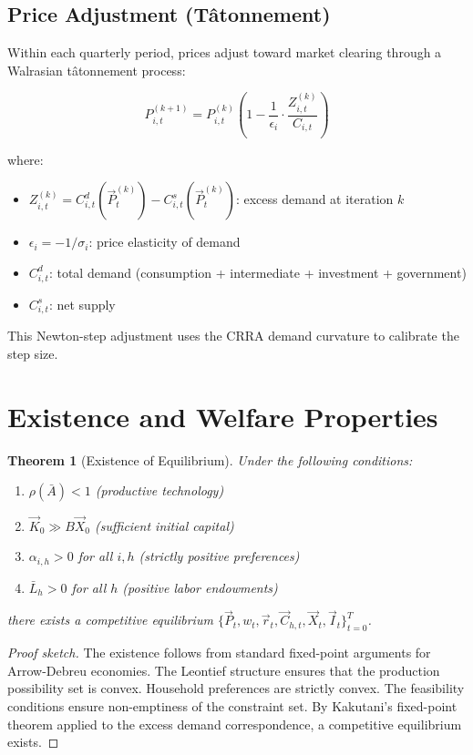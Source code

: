 \documentclass[12pt,a4paper]{article}
\newtheorem{theorem}{Theorem}[section]
\theoremstyle{definition}
\theoremstyle{remark}
\begin{document}
\subsection{Price Adjustment (Tâtonnement)}

Within each quarterly period, prices adjust toward market clearing through a Walrasian tâtonnement process:

\begin{equation}
    P_{i,t}^{(k+1)} = P_{i,t}^{(k)} \left(1 - \frac{1}{\epsilon_i} \cdot \frac{Z_{i,t}^{(k)}}{C_{i,t}}\right)
\end{equation}

where:
\begin{itemize}
    \item $Z_{i,t}^{(k)} = C_{i,t}^d(\vec{P}_t^{(k)}) - C_{i,t}^s(\vec{P}_t^{(k)})$: excess demand at iteration $k$
    \item $\epsilon_i = -1/\sigma_i$: price elasticity of demand
    \item $C_{i,t}^d$: total demand (consumption + intermediate + investment + government)
    \item $C_{i,t}^s$: net supply
\end{itemize}

This Newton-step adjustment uses the CRRA demand curvature to calibrate the step size.

\section{Existence and Welfare Properties}

\begin{theorem}[Existence of Equilibrium]
Under the following conditions:
\begin{enumerate}[label=(\roman*)]
    \item $\rho(\bar{A}) < 1$ (productive technology)
    \item $\vec{K}_0 \gg B\vec{X}_0$ (sufficient initial capital)
    \item $\alpha_{i,h} > 0$ for all $i,h$ (strictly positive preferences)
    \item $\bar{L}_h > 0$ for all $h$ (positive labor endowments)
\end{enumerate}
there exists a competitive equilibrium $\{\vec{P}_t, w_t, \vec{r}_t, \vec{C}_{h,t}, \vec{X}_t, \vec{I}_t\}_{t=0}^T$.
\end{theorem}

\begin{proof}[Proof sketch]
The existence follows from standard fixed-point arguments for Arrow-Debreu economies. The Leontief structure ensures that the production possibility set is convex. Household preferences are strictly convex. The feasibility conditions ensure non-emptiness of the constraint set. By Kakutani's fixed-point theorem applied to the excess demand correspondence, a competitive equilibrium exists.
\end{proof}
\end{document}
